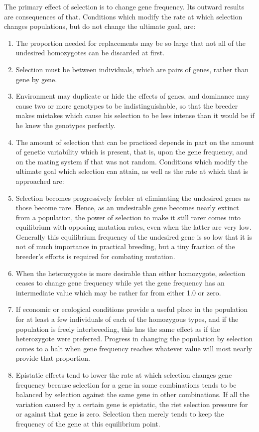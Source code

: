 The primary effect of selection is to change gene frequency. Its outward
results are consequences of that. Conditions which modify the
rate at which selection changes populations, but do not change the
ultimate goal, are:

\begin{enumerate}
\item The proportion needed for replacements may be so large that
not all of the undesired homozygotes can be discarded at first.
\item Selection must be between individuals, which are pairs of genes,
rather than gene by gene.
\item Environment may duplicate or hide the effects of genes, and
dominance may cause two or more genotypes to be indistinguishable,
so that the breeder makes mistakes which cause his selection to be less
intense than it would be if he knew the genotypes perfectly.
\item The amount of selection that can be practiced depends in part
on the amount of genetic variability which is present, that is, upon the
gene frequency, and on the mating system if that was not random.
Conditions which modify the ultimate goal which selection can
attain, as well as the rate at which that is approached are:
\item Selection becomes progressively feebler at eliminating the undesired
genes as those become rare. Hence, as an undesirable gene becomes
nearly extinct from a population, the power of selection to make it
still rarer comes into equilibrium with opposing mutation rates, even
when the latter are very low. Generally this equilibrium frequency of
the undesired gene is so low that it is not of much importance in practical
breeding, but a tiny fraction of the breeder's efforts is required for
combating mutation.
\item When the heterozygote is more desirable than either homozygote,
selection ceases to change gene frequency while yet the gene frequency
has an intermediate value which may be rather far from either 1.0 or
zero.
\item If economic or ecological conditions provide a useful place in
the population for at least a few individuals of each of the homozygous
types, and if the population is freely interbreeding, this has the same
effect as if the heterozygote were preferred. Progress in changing the
population by selection comes to a halt when gene frequency reaches
whatever value will most nearly provide that proportion.
\item Epistatic effects tend to lower the rate at which selection changes
gene frequency because selection for a gene in some combinations tends
to be balanced by selection against the same gene in other combinations.
If all the variation caused by a certain gene is epistatic, the riet
selection pressure for or against that gene is zero. Selection then merely
tends to keep the frequency of the gene at this equilibrium point.


\end{enumerate}
